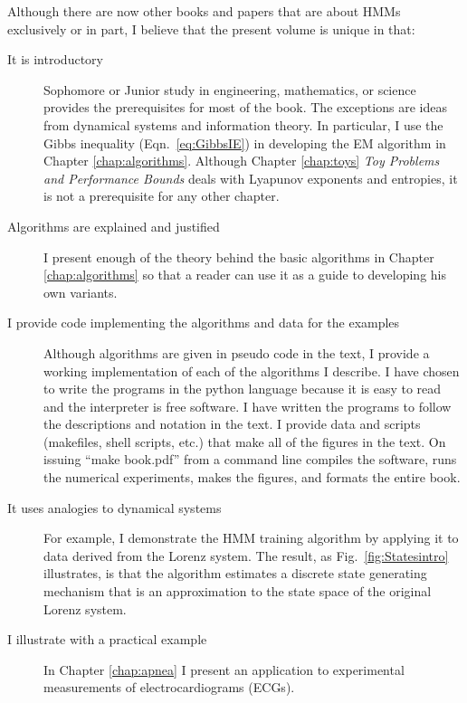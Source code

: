 \documentclass[ltxbook,showlabels, commentsvisible]{hmmdsbook}
\begin{document}
Although there are now other books and papers that are about HMMs
exclusively or in part, I believe that the present volume is unique in
that:
\begin{description}
\item[It is introductory] Sophomore or Junior study in engineering,
  mathematics, or science provides the prerequisites for most of the
  book.  The exceptions are ideas from dynamical systems and
  information theory.  In particular, I use the Gibbs inequality
  (Eqn.~\eqref{eq:GibbsIE}) in developing the EM algorithm in Chapter
  \ref{chap:algorithms}.  Although Chapter \ref{chap:toys} \emph{Toy
    Problems and Performance Bounds} deals with Lyapunov exponents and
  entropies, it is not a prerequisite for any other chapter.
\item[Algorithms are explained and justified] I present enough of the
  theory behind the basic algorithms in Chapter \ref{chap:algorithms}
  so that a reader can use it as a guide to developing his own
  variants.
\item[I provide code implementing the algorithms and data for the
  examples] Although algorithms are given in pseudo code in the text,
   I provide a working
  implementation of each of the algorithms I describe.  I have chosen
  to write the programs in the python language because it is easy to
  read and the interpreter is free software.  I have written the
  programs to follow the descriptions and notation in the text.  I
  provide data and scripts (makefiles, shell scripts, etc.)  that make
  all of the figures in the text.  On   issuing
  ``make book.pdf'' from a command line compiles the software, runs
  the numerical experiments, makes the figures, and formats the entire
  book.
\item[It uses analogies to dynamical systems] For example, I
  demonstrate the HMM training algorithm by applying it to data
  derived from the Lorenz system.  The result, as
  Fig.~\ref{fig:Statesintro} illustrates, is that the algorithm
  estimates a discrete state generating mechanism that is an
  approximation to the state space of the original Lorenz system.
\item[I illustrate with a practical example] In Chapter \ref{chap:apnea} I
  present an application to experimental measurements of
  electrocardiograms (ECGs).
\end{description}

\end{document}
